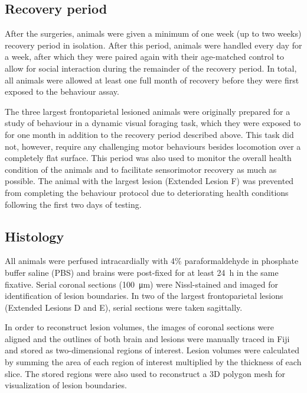 \subsection{Recovery period}

After the surgeries, animals were given a minimum of one week (up to two weeks) recovery period in isolation. After this period, animals were handled every day for a week, after which they were paired again with their age-matched control to allow for social interaction during the remainder of the recovery period. In total, all animals were allowed at least one full month of recovery before they were first exposed to the behaviour assay.

The three largest frontoparietal lesioned animals were originally prepared for a study of behaviour in a dynamic visual foraging task, which they were exposed to for one month in addition to the recovery period described above. This task did not, however, require any challenging motor behaviours besides locomotion over a completely flat surface. This period was also used to monitor the overall health condition of the animals and to facilitate sensorimotor recovery as much as possible. The animal with the largest lesion (Extended Lesion F) was prevented from completing the behaviour protocol due to deteriorating health conditions following the first two days of testing.

\subsection{Histology}

All animals were perfused intracardially with 4\% paraformal\-dehyde in phosphate buffer saline (PBS) and brains were post-fixed for at least \SI{24}{\hour} in the same fixative. Serial coronal sections (\SI{100}{\micro\meter}) were Nissl-stained and imaged for identification of lesion boundaries. In two of the largest frontoparietal lesions (Extended Lesions D and E), serial sections were taken sagittally.

In order to reconstruct lesion volumes, the images of coronal sections were aligned and the outlines of both brain and lesions were manually traced in Fiji \citep{Schindelin2012} and stored as two-dimensional regions of interest. Lesion volumes were calculated by summing the area of each region of interest multiplied by the thickness of each slice. The stored regions were also used to reconstruct a 3D polygon mesh for visualization of lesion boundaries.

